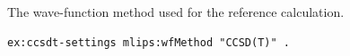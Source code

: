 The wave-function method used for the reference calculation.
\begin{lstlisting}[language=turtle]
ex:ccsdt-settings mlips:wfMethod "CCSD(T)" .
\end{lstlisting}
